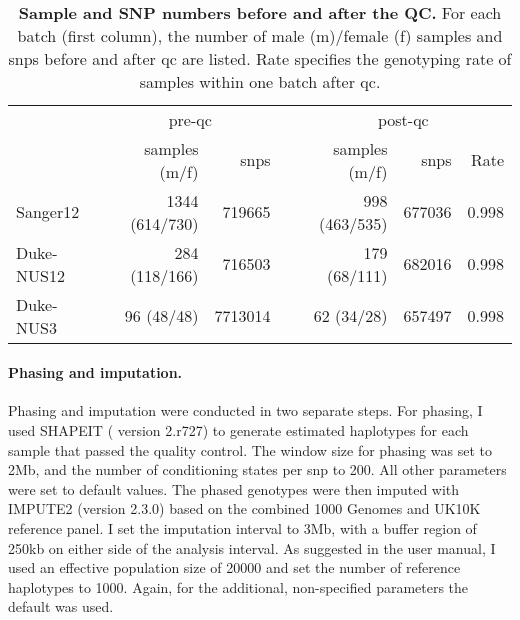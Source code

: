 \\
\begin{table}[htbp]
  \centering
  \caption[\textbf{Sample and SNP numbers before and after the QC. }]{\textbf{Sample and SNP numbers before and after the QC. } For each batch (first column), the number of male (m)/female (f) samples and \glspl{snp} before and after \gls{qc} are listed. Rate specifies the genotyping rate of samples within one batch after \gls{qc}. }
    \begin{tabular}{lrrrrrr}
    \toprule
          & \multicolumn{2}{c}{pre-\gls{qc}} &       & \multicolumn{3}{c}{post-\gls{qc}} \\
\cmidrule{2-3}\cmidrule{5-7}          & samples (m/f) & \glspl{snp}  &       & samples (m/f) & \glspl{snp}  & Rate \\
\cmidrule{2-7}    Sanger12 & \num{1344}  (\num{614}/\num{730}) & \num{719665} &       & \num{998} (\num{463}/\num{535}) & \num{677036} & \num{0.998} \\
    Duke-NUS12 & \num{284} (\num{118}/\num{166}) & \num{716503} &       & \num{179} (\num{68}/\num{111}) & \num{682016} & \num{0.998} \\
    Duke-NUS3 & \num{96} (\num{48}/\num{48}) & \num{7713014} &       & \num{62} (\num{34}/\num{28}) & \num{657497} & \num{0.998} \\
    \bottomrule
    \end{tabular}%
    \label{tab:genoOverview}%
\end{table}%

\paragraph{Phasing and imputation.} Phasing and imputation were conducted in two separate steps. For phasing, I used SHAPEIT ( version 2.r727) \citep{Delaneau2012,Delaneau2013} to generate estimated haplotypes for each sample that passed the quality control. The window size for phasing was set to 2Mb, and the number of conditioning states per \gls{snp} to \num{200}. All other parameters were set to default values. The phased genotypes were then imputed with IMPUTE2  (version 2.3.0) \citep{Marchini2007, Howie2009} based on the combined \num{1000} Genomes \citep{1000Genomes2015} and UK10K \citep{UK10KConsortium2015} reference panel. I set the imputation interval to 3Mb,  with a buffer region of \num{250}kb on either side of the analysis interval. As suggested in the user manual, I used an effective population size of \num{20000} and set the number of reference haplotypes to \num{1000}. Again, for the additional, non-specified parameters the default was used.

